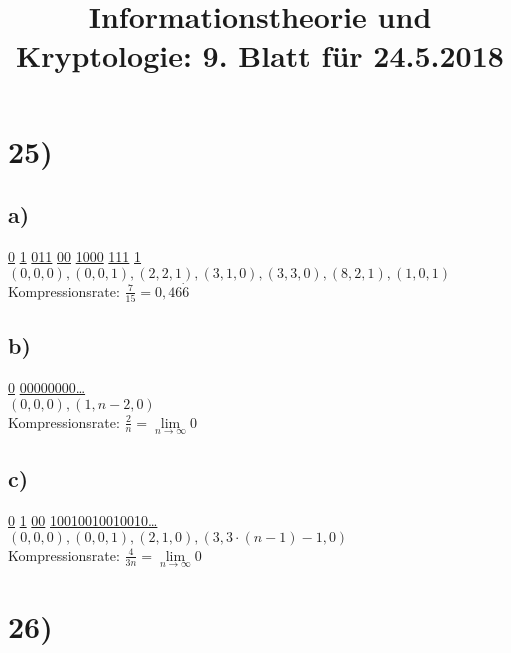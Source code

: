 %



  \title{Informationstheorie und Kryptologie: 9. Blatt für 24.5.2018}
  \maketitle

  \section*{25)}

    \subsection*{a)}

      \underline{0} \underline{1} \underline{011} \underline{00} \underline{1000} \underline{111} \underline{1} \\

      $(0,0,0), (0,0,1), (2,2,1), (3,1,0), (3,3,0), (8,2,1), (1,0,1)$\\

      Kompressionsrate: $\frac{7}{15} = 0,46\dot{6}$

    \subsection*{b)}

      \underline{0} \underline{00000000\ldots}\\

      $(0,0,0), (1,n-2,0)$\\

      Kompressionsrate: $\frac{2}{n} = \lim\limits_{n \rightarrow \infty}{0}$

    \subsection*{c)}

      \underline{0} \underline{1} \underline{00} \underline{10010010010010\ldots}\\

      $(0,0,0), (0,0,1), (2,1,0), (3,3 \cdot (n - 1) - 1,0)$\\

      Kompressionsrate: $\frac{4}{3n} = \lim\limits_{n \rightarrow \infty}{0}$

  \section*{26)}


